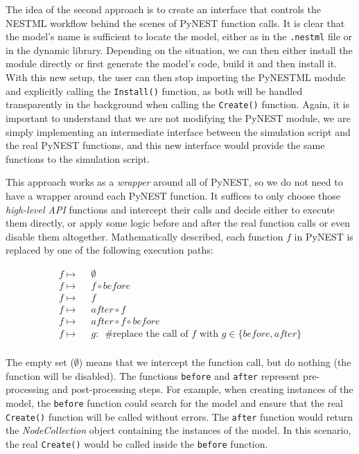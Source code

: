 The idea of the second approach is to create an interface that controls the NESTML workflow behind the scenes of PyNEST function calls. It is clear that the model's name is sufficient to locate the model, either as in the \texttt{.nestml} file or in the dynamic library. Depending on the situation, we can then either install the module directly or first generate the model's code, build it and then install it. With this new setup, the user can then stop importing the PyNESTML module and explicitly calling the \texttt{Install()} function, as both will be handled transparently in the background when calling the \texttt{Create()} function. Again, it is important to understand that we are not modifying the PyNEST module, we are simply implementing an intermediate interface between the simulation script and the real PyNEST functions, and this new interface would provide the same functions to the simulation script.

This approach works as a \emph{wrapper} around all of PyNEST, so we do not need to have a wrapper around each PyNEST function. It suffices to only choose those \emph{high-level API} functions and intercept their calls and decide either to execute them directly, or apply some logic before and after the real function calls or even disable them altogether. Mathematically described, each function $f$ in PyNEST is replaced by one of the following execution paths:

\begin{align*}
f \mapsto&\enspace\emptyset\\
f \mapsto&\enspace f \circ before \\
f \mapsto&\enspace f \\
f \mapsto&\enspace after \circ f \\
f \mapsto&\enspace after \circ f \circ before\\
f \mapsto&\enspace g:\enspace \text{\#replace the call of } f \text{ with } g \in \{before, after\}  \\
\end{align*}

The empty set ($\emptyset$) means that we intercept the function call, but do nothing (the function will be disabled). The functions \texttt{before} and \texttt{after} represent pre-processing and post-processing steps. For example, when creating instances of the model, the \texttt{before} function could search for the model and ensure that the real \texttt{Create()} function will be called without errors. The \texttt{after} function would return the \emph{NodeCollection} object containing the instances of the model. In this scenario, the real \texttt{Create()} would be called inside the \texttt{before} function.

